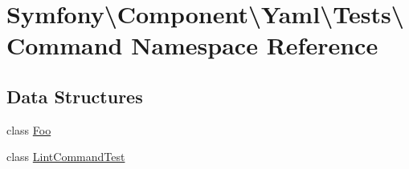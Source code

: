 \hypertarget{namespace_symfony_1_1_component_1_1_yaml_1_1_tests_1_1_command}{}\section{Symfony\textbackslash{}Component\textbackslash{}Yaml\textbackslash{}Tests\textbackslash{}Command Namespace Reference}
\label{namespace_symfony_1_1_component_1_1_yaml_1_1_tests_1_1_command}
\subsection*{Data Structures}
\begin{DoxyCompactItemize}
\item 
class \mbox{\hyperlink{class_symfony_1_1_component_1_1_yaml_1_1_tests_1_1_command_1_1_foo}{Foo}}
\item 
class \mbox{\hyperlink{class_symfony_1_1_component_1_1_yaml_1_1_tests_1_1_command_1_1_lint_command_test}{Lint\+Command\+Test}}
\end{DoxyCompactItemize}

